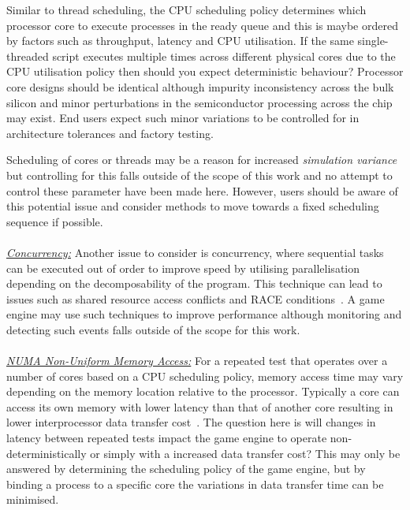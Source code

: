 \documentclass[letterpaper, 10 pt, journal, twoside]{IEEEtran}
\begin{document}
Similar to thread scheduling, the CPU scheduling policy determines which processor core to execute processes in the ready queue and this is maybe ordered by factors such as throughput, latency and CPU utilisation. If the same single-threaded script executes multiple times across different physical cores due to the CPU utilisation policy then should you expect deterministic behaviour? Processor core designs should be identical although impurity inconsistency across the bulk silicon and minor perturbations in the semiconductor processing across the chip may exist. End users expect such minor variations to be controlled for in architecture tolerances and factory testing.

Scheduling of cores or threads may be a reason for increased \textit{simulation variance} but controlling for this falls outside of the scope of this work and no attempt to control these parameter have been made here. However, users should be aware of this potential issue and consider methods to move towards a fixed scheduling sequence if possible.
\\\\
\noindent\underline{\textit{Concurrency:}}
Another issue to consider is concurrency, where sequential tasks can be executed out of order to improve speed by utilising parallelisation depending on the decomposability of the program. This technique can lead to issues such as shared resource access conflicts and RACE conditions~\cite{huffman1954synthesis}. A game engine may use such techniques to improve performance although monitoring and detecting such events falls outside of the scope for this work. 
\\\\
\noindent\underline{\textit{NUMA Non-Uniform Memory Access:}}
For a repeated test that operates over a number of cores based on a CPU scheduling policy, memory access time may vary depending on the memory location relative to the processor. Typically a core can access its own memory with lower latency than that of another core resulting in lower interprocessor data transfer cost~\cite{nieplocha1996global}. The question here is will changes in latency between repeated tests impact the game engine to operate non-deterministically or simply with a increased data transfer cost? This may only be answered by determining the scheduling policy of the game engine, but by binding a process to a specific core the variations in data transfer time can be minimised.
\\\\
\end{document}
